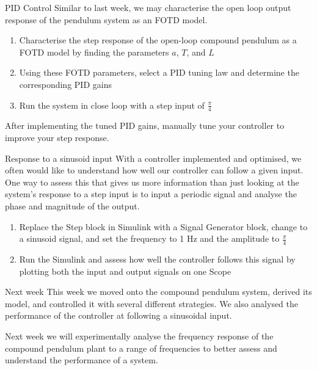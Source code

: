\documentclass[9pt]{beamer-control}
\begin{document}
\begin{frame}{PID Control}
Similar to last week, we may characterise the open loop output response of the pendulum system as an FOTD model.

\begin{enumerate}
	\item Characterise the step response of the open-loop compound pendulum as a FOTD model by finding the parameters $a$, $T$, and $L$
	\item Using these FOTD parameters, select a PID tuning law and determine the corresponding PID gains
	\item Run the system in close loop with a step input of $\tfrac{\pi}{4}$
	
\end{enumerate}

After implementing the tuned PID gains, manually tune your controller to improve your step response.

\end{frame}




\begin{frame}{Response to a sinusoid input}
With a controller implemented and optimised, we often would like to understand how well our controller can follow a given input. One way to assess this that gives us more information than just looking at the system's response to a step input is to input a periodic signal and analyse the phase and magnitude of the output.

\begin{enumerate}
	\item Replace the Step block in Simulink with a Signal Generator block, change to a sinusoid signal, and set the frequency to 1 Hz and the amplitude to $\tfrac{\pi}{4}$
	\item Run the Simulink and assess how well the controller follows this signal by plotting both the input and output signals on one Scope
\end{enumerate}

\end{frame}



\begin{frame}{Next week}
	This week we moved onto the compound pendulum system, derived its model, and controlled it with several different strategies. We also analysed the performance of the controller at following a sinusoidal input.
	
	Next week we will experimentally analyse the frequency response of the compound pendulum plant to a range of frequencies to better assess and understand the performance of a system.
\end{frame}
\end{document}
